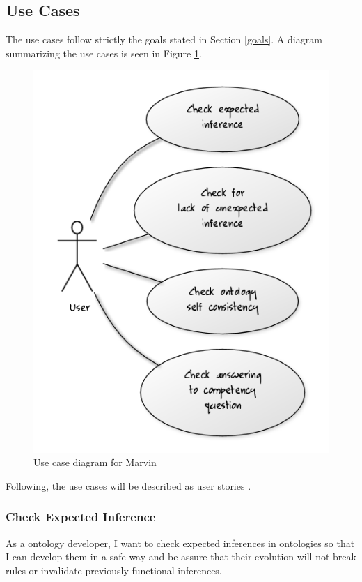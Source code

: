 \documentclass{report}
\begin{document}
\subsection{Use Cases}

The use cases follow strictly the goals stated in Section \ref{goals}. A diagram summarizing the use cases is seen
in Figure \ref{figUseCase}.

\begin{figure}[!hbt]
    \centering
    \label{figUseCase}
    \caption{Use case diagram for Marvin}
    \includegraphics[scale=0.5]{fig/use_case_diagram.png}
\end{figure}

Following, the use cases will be described as user stories \cite{beck04}.

\subsubsection{Check Expected Inference}

As a ontology developer, I want to check expected inferences in ontologies so that I can develop them
in a safe way and be assure that their evolution will not break rules or invalidate previously
functional inferences.
\end{document}
